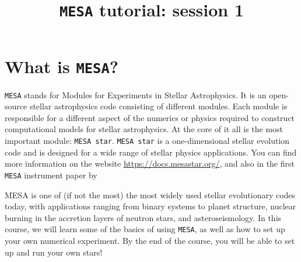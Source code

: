 \documentclass[11pt,a4paper]{article}
\begin{document}
\title{\textbf{\texttt{MESA} tutorial: session 1}}
\author{}
\date{}
\maketitle



\section{What is \texttt{MESA}?}

\texttt{MESA} stands for Modules for Experiments in Stellar Astrophysics. It is an open-source stellar astrophysics code consisting of different modules. Each module is responsible for a different aspect of the numerics or physics required to construct computational models for stellar astrophysics. At the core of it all is the most important module: \texttt{MESA star}. \texttt{MESA star} is a one-dimensional stellar evolution code and is designed for a wide range of stellar physics applications. You can find more information on the website \url{https://docs.mesastar.org/}, and also in the first \texttt{MESA} instrument paper by  \cite{Paxton2011} %


MESA is one of (if not the most) the most widely used stellar evolutionary codes today, with applications ranging from binary systems to planet structure, nuclear burning in the accretion layers of neutron stars, and asteroseismology. 
In this course, we will learn some of the basics of using \texttt{MESA}, as well as how to set up your own numerical experiment. By the end of the course, you will be able to set up and run your own stars! 
\end{document}
